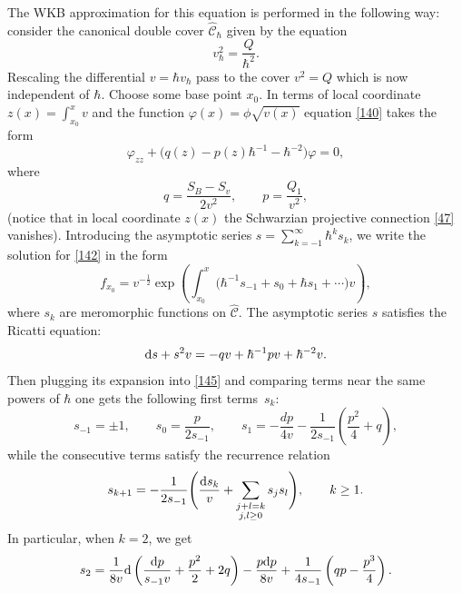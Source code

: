 \documentclass[pdftex]{sigma}
\numberwithin{equation}{section}
\theoremstyle{definition}
\begin{document}
The WKB approximation for this equation is performed in the following way:
consider the canonical double cover $\hat{\mathcal{C}}_\hbar$ given by the equation
\begin{equation*}%
 v_{\hbar}^2=\frac{Q}{\hbar^2}.
 \end{equation*}
Rescaling the differential $v=\hbar v_\hbar$ pass to the cover $v^2=Q$ which is now independent of $\hbar$. Choose some base point $x_0.$ In terms of local coordinate $z(x)=\int^x_{x_0}v$ and the function $\varphi(x)=\phi\sqrt{v(x)}$ equation \eqref{140} takes the form
\begin{equation}\label{142}
 \varphi_{zz}+\big(q(z)-p(z)\hbar^{-1}-\hbar^{-2}\big)\varphi=0,
\end{equation}
where
\begin{equation*}%
q=\frac{S_B-S_v}{2v^2}, \qquad p=\frac{Q_1}{v^2},
\end{equation*}
(notice that in local coordinate $z(x)$ the Schwarzian projective connection \eqref{47} vanishes). Introducing the asymptotic series $s=\sum^{\infty}_{k=-1}\hbar^k s_k$, we write the solution for \eqref{142} in the form
\begin{equation*}%
f_{x_0}=v^{-\frac{1}{2}}\exp \left(\int^x_{x_0}\big(\hbar^{-1}s_{-1}+s_0+\hbar s_1 +\cdots \big)v\right) ,
\end{equation*}
where $s_k$ are meromorphic functions on $\hat{\mathcal{C}}.$ The asymptotic series $s$ satisfies the Ricatti equation:%
\begin{equation}\label{145}
{\rm d}s+s^2v=-qv+\hbar^{-1}pv+\hbar^{-2}v.
\end{equation}
Then plugging its expansion into \eqref{145} and comparing terms near the same powers of $\hbar$ one gets the following first terms~$s_k$:
\begin{equation}\label{146}
s_{-1}=\pm 1,\qquad s_0=\frac{p}{2s_{-1}},\qquad s_1=-\frac{d p}{4v} -\frac{1}{2 s_{-1}}\left(\frac{p^2}{4}+q \right),
\end{equation}
while the consecutive terms satisfy the recurrence relation
\begin{equation}\label{147}s_{k+1}=-\frac{1}{2s_{-1}}\Bigg(\frac{{\rm d} s_k}{v}+\sum_{\substack {j+l=k \\ j,l\geq 0}}s_j s_l \Bigg), \qquad k \geq 1. \end{equation}
In particular, when $k=2$, we get
\begin{equation*}%
s_2= \frac{1}{8v}{\rm d}\left(\frac{{\rm d}p}{s_{-1}v}+\frac{p^2}{2}+2q \right)-\frac{p {\rm d}p}{8v}+\frac{1}{4 s_{-1}}\left(qp-\frac{p^3}{4}\right).\end{equation*}
\end{document}
